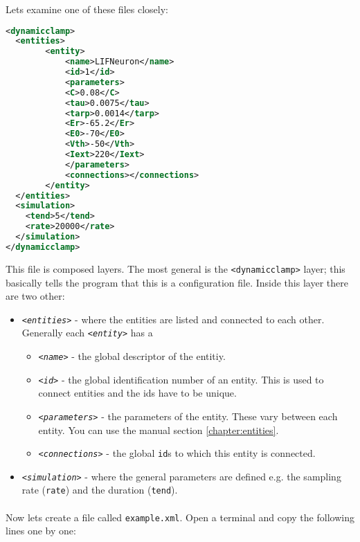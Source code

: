 Lets examine one of these files closely:

\renewcommand{\lstlistingname}{Example}
\begin{lstlisting}[caption={A simple example of a configuration file with a simulated integrate and fire neuron.},label={gettingStarted:example0},language=XML,morekeywords={dynamic clamp,entities,entity,name,id,C,tau,tarp,Er,E0,Vth,Iext,parameters,connections,simulation,tend,rate}]
<dynamicclamp>
  <entities>
    	<entity>
      		<name>LIFNeuron</name>
      		<id>1</id>
      		<parameters>
			<C>0.08</C>
			<tau>0.0075</tau>
			<tarp>0.0014</tarp>
			<Er>-65.2</Er>
			<E0>-70</E0>
			<Vth>-50</Vth>
			<Iext>220</Iext>
      		</parameters>
      		<connections></connections>
    	</entity>
  </entities>
  <simulation>
  	<tend>5</tend>
   	<rate>20000</rate>
  </simulation>
</dynamicclamp>

\end{lstlisting}
 
This file is composed layers. The most general is the \texttt{<dynamicclamp>} layer; this basically tells the program that this is a configuration file. Inside this layer there are two other:
\begin{itemize}
\item
\emph{ \texttt{<entities>}}  - where the entities are listed and connected to each other. Generally each \emph{ \texttt{<entity>}} has a 
	\begin{itemize}
	\item \emph{ \texttt{<name>}} - the global descriptor of the entitiy. 
	\item \emph{ \texttt{<id>}} - the global identification number of an entity. This is used to connect entities and the ids have to be unique.
	\item \emph{ \texttt{<parameters>}} - the parameters of the entity. These vary between each entity. You can use the manual section \ref{chapter:entities}.
	\item \emph{ \texttt{<connections>}} - the global \texttt{id}s to which this entity is connected.
	\end{itemize}
\item
\emph{ \texttt{<simulation>}} - where the general parameters are defined e.g. the sampling rate (\texttt{rate}) and the duration (\texttt{tend}).
\end{itemize}

\paragraph{}
Now lets create a file called \texttt{example.xml}. Open a terminal and copy the following lines one by one:

